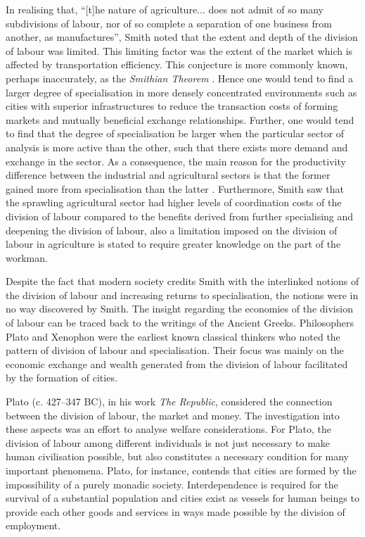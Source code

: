In realising that, ``[t]he nature of agriculture... does not admit of so many subdivisions of labour, nor of so complete a separation of one business from another, as manufactures'', Smith noted that the extent and depth of the division of labour was limited. This limiting factor was the extent of the market which is affected by transportation efficiency. This conjecture is more commonly known, perhaps inaccurately, as the \textit{Smithian Theorem} \citep{Stigler1951}. Hence one would tend to find a larger degree of specialisation in more densely concentrated environments such as cities with superior infrastructures to reduce the transaction costs of forming markets and mutually beneficial exchange relationships. Further, one would tend to find that the degree of specialisation be larger when the particular sector of analysis is more active than the other, such that there exists more demand and exchange in the sector. As a consequence, the main reason for the productivity difference between the industrial and agricultural sectors is that the former gained more from specialisation than the latter \citep[p.~18]{Smith1776}. Furthermore, Smith saw that the sprawling agricultural sector had higher levels of coordination costs of the division of labour compared to the benefits derived from further specialising and deepening the division of labour, also a limitation imposed on the division of labour in agriculture is stated to require greater knowledge on the part of the workman.

\medskip \noindent Despite the fact that modern society credits Smith with the interlinked notions of the division of labour and increasing returns to specialisation, the notions were in no way discovered by Smith. The insight regarding the economies of the division of labour can be traced back to the writings of the Ancient Greeks. Philosophers Plato and Xenophon were the earliest known classical thinkers who noted the pattern of division of labour and specialisation. Their focus was mainly on the economic exchange and wealth generated from the division of labour facilitated by the formation of cities.

Plato (c. 427--347 BC), in his work \textit{The Republic}, considered the connection between the division of labour, the market and money. The investigation into these aspects was an effort to analyse welfare considerations. For Plato, the division of labour among different individuals is not just necessary to make human civilisation possible, but also constitutes a necessary condition for many important phenomena. Plato, for instance, contends that cities are formed by the impossibility of a purely monadic society. Interdependence is required for the survival of a substantial population and cities exist as vessels for human beings to provide each other goods and services in ways made possible by the division of employment.

